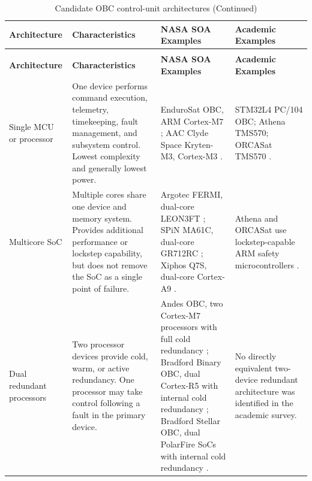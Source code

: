 \documentclass[10pt]{../datasheet}
\let\cite\citep
\begin{document}
\begin{longtable}{|p{2.8cm}|p{4.6cm}|p{5.3cm}|p{3.8cm}|}
  \caption{Candidate OBC control-unit architectures} \label{tab:control_architectures} \\ \hline
  \textbf{Architecture}                                     &
  \textbf{Characteristics}                                  &
  \textbf{NASA SOA Examples}                                &
  \textbf{Academic Examples}                                                           \\ \hline
  \endfirsthead
  \caption[]{Candidate OBC control-unit architectures (Continued)}                     \\ \hline
  \textbf{Architecture}                                     &
  \textbf{Characteristics}                                  &
  \textbf{NASA SOA Examples}                                &
  \textbf{Academic Examples}                                                           \\ \hline
  \endhead
  \hline
  \endfoot

  Single MCU or processor                                   &
  One device performs command execution, telemetry, timekeeping, fault
  management, and subsystem control. Lowest complexity and generally lowest
  power.                                                    &
  EnduroSat OBC, ARM Cortex-M7
  \cite[p.~229]{nasa_soa_2023};
  AAC Clyde Space Kryten-M3, Cortex-M3
  \cite[p.~228]{nasa_soa_2023}.                             &
  STM32L4 PC/104 OBC; Athena TMS570; ORCASat TMS570
  \cite{stm32l4_vst104_pub,athena_obc_site,orcasat_obc_site}.                          \\ \hline

  Multicore SoC                                             &
  Multiple cores share one device and memory system. Provides additional
  performance or lockstep capability, but does not remove the SoC as a
  single point of failure.                                  &
  Argotec FERMI, dual-core LEON3FT
  \cite[p.~229]{nasa_soa_2023};
  SPiN MA61C, dual-core GR712RC
  \cite[p.~236]{nasa_soa_2024};
  Xiphos Q7S, dual-core Cortex-A9
  \cite[p.~238]{nasa_soa_2024}.                             &
  Athena and ORCASat use lockstep-capable ARM safety microcontrollers
  \cite{athena_obc_ti_prod,orcasat_obc_ds}.                                            \\ \hline

  Dual redundant processors                                 &
  Two processor devices provide cold, warm, or active redundancy. One processor
  may take control following a fault in the primary device. &
  Andes OBC, two Cortex-M7 processors with full cold redundancy
  \cite[p.~230]{nasa_soa_2026};
  Bradford Binary OBC, dual Cortex-R5 with internal cold redundancy
  \cite[p.~229]{nasa_soa_2023};
  Bradford Stellar OBC, dual PolarFire SoCs with internal cold redundancy
  \cite[p.~230]{nasa_soa_2026}.                             &
  No directly equivalent two-device redundant architecture was identified in
  the academic survey.                                                                 \\ \hline


\end{longtable}
\end{document}
